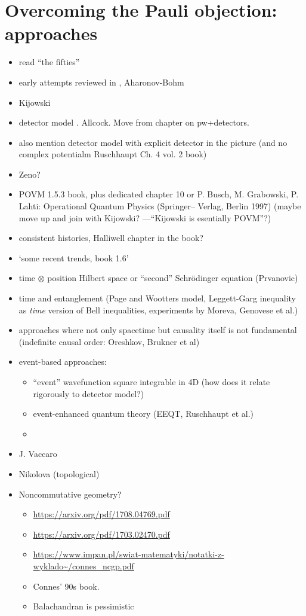 \section{Overcoming the Pauli objection: approaches}

\begin{itemize}
\item read ``the fifties''
\item early attempts reviewed in \cite{TQM1, TQM2}, Aharonov-Bohm
\item Kijowski
\item detector model \cite{TQM1, TQM2}. Allcock. Move from chapter on pw+detectors.
\item also mention detector model with explicit detector in the picture (and no complex potentialm Ruschhaupt Ch. 4 vol. 2 book)
\item Zeno?
\item POVM 1.5.3 book, plus dedicated chapter 10 or P. Busch, M. Grabowski, P. Lahti: Operational Quantum Physics (Springer–
Verlag, Berlin 1997) (maybe move up and join with Kijowski? ---``Kijowski is esentially POVM''?)
\item consistent histories, Halliwell chapter in the book?
\item `some recent trends, book 1.6'
\item
    time $\otimes$ position Hilbert space or ``second'' Schr\"odinger equation (Prvanovic)
\item time and entanglement (Page and Wootters model, Leggett-Garg inequality as \emph{time} version of Bell inequalities, experiments by Moreva, Genovese et al.)
\item approaches where not only spacetime but causality itself is not fundamental (indefinite causal order: Oreshkov, Brukner et al)
\item event-based approaches:
  \begin{itemize}
    \item ``event'' wavefunction square integrable in 4D (how does it relate rigorously to detector model?)
    \item event-enhanced quantum theory (EEQT, Ruschhaupt et al.)
    \item
  \end{itemize}
\item J. Vaccaro
\item Nikolova (topological)
\item Noncommutative geometry?
\begin{itemize}
  \item \url{https://arxiv.org/pdf/1708.04769.pdf}
  \item \url{https://arxiv.org/pdf/1703.02470.pdf}
  \item \url{https://www.impan.pl/swiat-matematyki/notatki-z-wyklado~/connes_ncgp.pdf}
  \item Connes' 90s book.
  \item Balachandran is pessimistic
\end{itemize}
\end{itemize}
